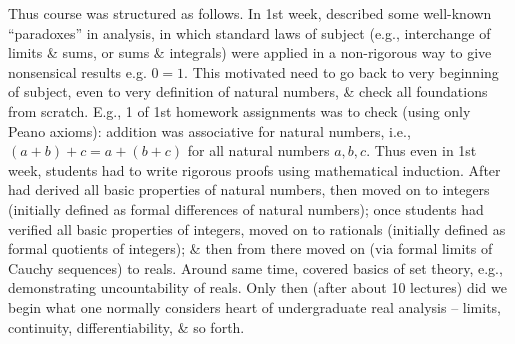 \documentclass{article}
\begin{document}
\begin{itemize}
	Thus course was structured as follows. In 1st week, described some well-known ``paradoxes'' in analysis, in which standard laws of subject (e.g., interchange of limits \& sums, or sums \& integrals) were applied in a non-rigorous way to give nonsensical results e.g. $0 = 1$. This motivated need to go back to very beginning of subject, even to very definition of natural numbers, \& check all foundations from scratch. E.g., 1 of 1st homework assignments was to check (using only Peano axioms): addition was associative for natural numbers, i.e., $(a + b) + c = a + (b + c)$ for all natural numbers $a,b,c$. Thus even in 1st week, students had to write rigorous proofs using mathematical induction. After had derived all basic properties of natural numbers, then moved on to integers (initially defined as formal differences of natural numbers); once students had verified all basic properties of integers, moved on to rationals (initially defined as formal quotients of integers); \& then from there moved on (via formal limits of Cauchy sequences) to reals. Around same time, covered basics of set theory, e.g., demonstrating uncountability of reals. Only then (after about 10 lectures) did we begin what one normally considers heart of undergraduate real analysis -- limits, continuity, differentiability, \& so forth.
	

\end{itemize}
\end{document}

